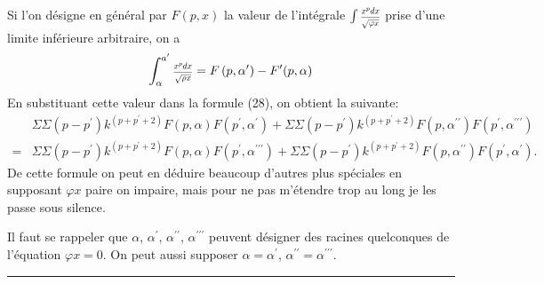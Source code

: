\documentclass[oneside, 12 pt, leqno]{memoir}
\let\oldfrac\frac
\def\frac#1#2{\mathchoice{\text{\scalebox{.83}{${\oldfrac{#1}{#2}}$}}}{\text{\scalebox{.83}{${\displaystyle\oldfrac{#1}{#2}}$}}}{\genfrac{}{}{}{2}{#1}{#2}}{\genfrac{}{}{}{3}{#1}{#2}}}
\begin{document}
Si l'on désigne en général par \(F(p, x)\) la valeur de l'intégrale \(\int \frac{x^p d x}{\sqrt{\varphi x}}\) prise d'une limite inférieure arbitraire, on a
\[\int_\alpha^{a^{\prime}} \frac{x^p d x}{\sqrt{\rho x}}=F\left(p, \alpha^{\prime}\right)-F^{\prime}(p, \alpha)\]
En substituant cette valeur dans la formule (28), on obtient la suivante:
\[\tag{29}\begin{aligned}
& \Sigma \Sigma\left(p-p^{\prime}\right) k^{\left(p+p^{\prime}+2\right)} F(p, \alpha) F\left(p^{\prime}, \alpha^{\prime}\right)+\Sigma \Sigma\left(p-p^{\prime}\right) k^{\left(p+p^{\prime}+2\right)} F\left(p, \alpha^{\prime \prime}\right) F\left(p^{\prime}, \alpha^{\prime \prime \prime}\right) \\
= & \Sigma \Sigma\left(p-p^{\prime}\right) k^{\left(p+p^{\prime}+2\right)} F(p, \alpha) F\left(p^{\prime}, \alpha^{\prime \prime \prime}\right)+\Sigma \Sigma\left(p-p^{\prime}\right) k^{\left(p+p^{\prime}+2\right)} F\left(p, \alpha^{\prime \prime}\right) F\left(p^{\prime}, \alpha^{\prime}\right).
\end{aligned}\]
De cette formule on peut en déduire beaucoup d'autres plus spéciales en supposant \(\varphi x\) paire on impaire, mais pour ne pas m'étendre trop au long je les passe sous silence.

Il faut se rappeler que \(\alpha\), \(\alpha^{\prime}\), \(\alpha^{\prime \prime}\), \(\alpha^{\prime \prime \prime}\) peuvent désigner des racines quelconques de l'équation \(\varphi x=0\). On peut aussi supposer \(\alpha=\alpha^{\prime}\), \(\alpha^{\prime \prime}=\alpha^{\prime \prime \prime}\).
\begin{center}\rule{2in}{0.1pt}\end{center}
\end{document}
